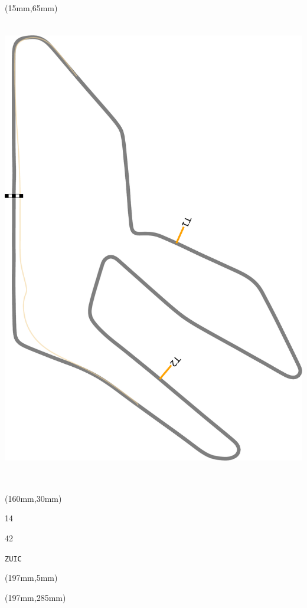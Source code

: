 \begin{textblock*}{185mm}(15mm,65mm)%
\centering
\mbox{\includegraphics[width=185mm,height=210mm,keepaspectratio]{PT/ZUIC.pdf}}
\end{textblock*}
\begin{textblock*}{40mm}(160mm,30mm)%
\Large
\par{} 
\par14 
\par42 
\par\hfill\tiny\tt ZUIC\\
\end{textblock*}
\begin{textblock*}{20mm}(197mm,5mm)%
\fbox{\thepage}
\label{ZUIC}
\end{textblock*}
\begin{textblock*}{20mm}(197mm,285mm)%
\fbox{\thepage}
\end{textblock*}

